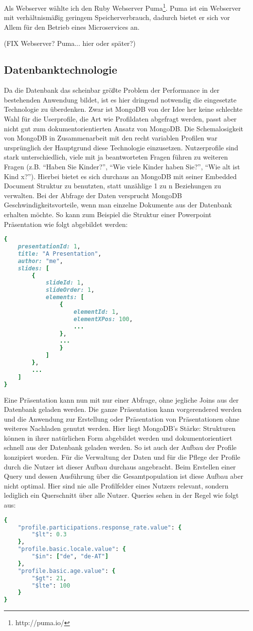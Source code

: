 Als Webserver wählte ich den Ruby Webserver Puma\footnote{http://puma.io/}. Puma ist ein Webserver mit verhältnismäßig geringem Speicherverbrauch, dadurch bietet er sich vor Allem für den Betrieb eines Microservices an.

(FIX Webserver? Puma... hier oder später?)

\subsection{Datenbanktechnologie}
Da die Datenbank das scheinbar größte Problem der Performance in der bestehenden Anwendung bildet, ist es hier dringend notwendig die eingesetzte Technologie zu überdenken. Zwar ist MongoDB von der Idee her keine schlechte Wahl für die Userprofile, die Art wie Profildaten abgefragt werden, passt aber nicht gut zum dokumentorientierten Ansatz von MongoDB.
Die Schemalosigkeit von MongoDB in Zusammenarbeit mit den recht variablen Profilen war ursprünglich der Hauptgrund diese Technologie einzusetzen. Nutzerprofile sind stark unterschiedlich, viele mit ja beantworteten Fragen führen zu weiteren Fragen (z.B. ``Haben Sie Kinder?'', ``Wie viele Kinder haben Sie?'', ``Wie alt ist Kind x?''). Hierbei bietet es sich durchaus an MongoDB mit seiner Embedded Document Struktur zu benutzten, statt unzählige 1 zu n Beziehungen zu verwalten.
Bei der Abfrage der Daten versprucht MongoDB Geschwindigkeitsvorteile, wenn man einzelne Dokumente aus der Datenbank erhalten möchte. So kann zum Beispiel die Struktur einer Powerpoint Präsentation wie folgt abgebildet werden:
\begin{lstlisting}[language=Ruby]
{
    presentationId: 1,
    title: "A Presentation",
    author: "me",
    slides: [
        {
            slideId: 1,
            slideOrder: 1,
            elements: [
                {
                    elementId: 1,
                    elementXPos: 100,
                    ...
                },
                ...
                }
            ]
        },
        ...
    ]
}
\end{lstlisting}
Eine Präsentation kann nun mit nur einer Abfrage, ohne jegliche Joins aus der Datenbank geladen werden. Die ganze Präsentation kann vorgerendered werden und die Anwendung zur Erstellung oder Präsentation von Präsentationen ohne weiteres Nachladen genutzt werden. Hier liegt MongoDB's Stärke: Strukturen können in ihrer natürlichen Form abgebildet werden und dokumentorientiert schnell aus der Datenbank geladen werden.
So ist auch der Aufbau der Profile konzipiert worden. Für die Verwaltung der Daten und für die Pflege der Profile durch die Nutzer ist dieser Aufbau durchaus angebracht.
Beim Erstellen einer Query und dessen Ausführung über die Gesamtpopulation ist diese Aufbau aber nicht optimal. Hier sind nie alle Profilfelder eines Nutzers relevant, sondern lediglich ein Querschnitt über alle Nutzer. Queries sehen in der Regel wie folgt aus:
\begin{lstlisting}[language=Ruby]
{
    "profile.participations.response_rate.value": {
        "$lt": 0.3
    },
    "profile.basic.locale.value": {
        "$in": ["de", "de-AT"]
    },
    "profile.basic.age.value": {
        "$gt": 21,
        "$lte": 100
    }
}
\end{lstlisting}

